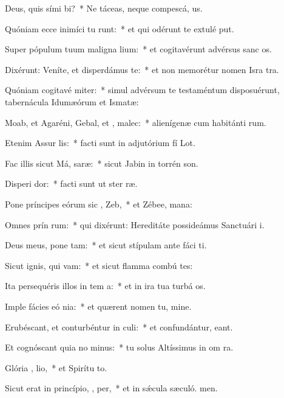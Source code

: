 \item Deus, quis sími  bi?~* Ne táceas, neque compescá, us.
\item Quóniam ecce inimíci tu runt:~* et qui odérunt te extulé put.
\item Super pópulum tuum maligna lium:~* et cogitavérunt advérsus sanc os.
\item Dixérunt: Veníte, et disperdámus   te:~* et non memorétur nomen Isra tra.
\item Quóniam cogitavé miter:~* simul advérsum te testaméntum disposuérunt, tabernácula Idumæórum et Ismatæ:
\item Moab, et Agaréni, Gebal, et ,  malec:~* alienígenæ cum habitánti rum.
\item Etenim Assur   lis:~* facti sunt in adjutórium fí Lot.
\item Fac illis sicut Má,  saræ:~* sicut Jabin in torrén son.
\item Disperi  dor:~* facti sunt ut ster ræ.
\item Pone príncipes eórum sic ,  Zeb,~* et Zébee,  mana:
\item Omnes prín rum:~* qui dixérunt: Hereditáte possideámus Sanctuári i.
\item Deus meus, pone   tam:~* et sicut stípulam ante fáci ti.
\item Sicut ignis, qui  vam:~* et sicut flamma combú tes:
\item Ita persequéris illos in tem a:~* et in ira tua turbá os.
\item Imple fácies eó nia:~* et quærent nomen tu, mine.
\item Erubéscant, et conturbéntur in  culi:~* et confundántur,  eant.
\item Et cognóscant quia no  minus:~* tu solus Altíssimus in om ra.
\item Glória ,  lio,~* et Spirítu to.
\item Sicut erat in princípio,  ,  per,~* et in sǽcula sæculó. men.
